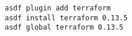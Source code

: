 \lstset{language=bash}
\begin{lstlisting}[frame=htrbl, caption={Terraform Setup}, label={lst:terraform_setup}]
asdf plugin add terraform
asdf install terraform 0.13.5
asdf global terraform 0.13.5
\end{lstlisting}